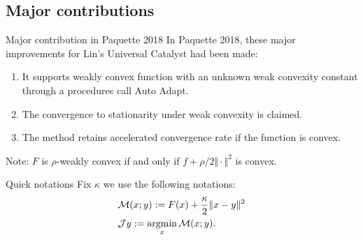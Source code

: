 \documentclass[11pt]{beamer}
\begin{document}
    \subsection{Major contributions}
        \begin{frame}{Major contribution in Paquette 2018}
            In Paquette 2018, these major improvements for Lin's Universal Catalyst had been made: 
            \begin{enumerate}
                \item It supports weakly convex function with an unknown weak convexity constant through a procedures call Auto Adapt. 
                \item The convergence to stationarity under weak convexity is claimed. 
                \item The method retains accelerated convergence rate if the function is convex. 
            \end{enumerate}
            Note: $F$ is $\rho$-weakly convex if and only if $f + \rho/2\Vert \cdot\Vert^2$ is convex. 
            \begin{block}{Quick notations}
                Fix $\kappa$ we use the following notations: 
                \begin{align*}
                & \mathcal M (x; y) := F(x) + \frac{\kappa}{2}\Vert x - y\Vert^2 
                \\
                & \mathcal J y := \mathop{\rm argmin}\limits_x \mathcal M (x; y). 
                \end{align*}
            \end{block}
        \end{frame}
\end{document}
